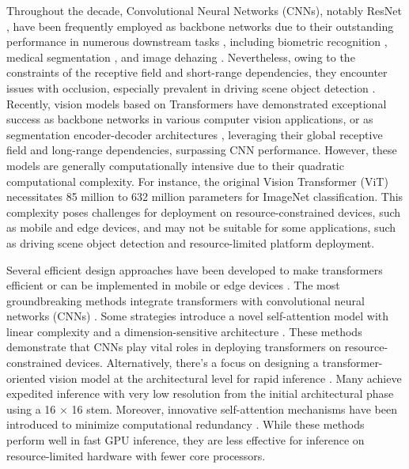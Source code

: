 Throughout the decade, Convolutional Neural Networks (CNNs), notably ResNet \cite{he2016deep}, have been frequently employed as backbone networks due to their outstanding performance in numerous downstream tasks \cite{Djenouri9757754}, including biometric recognition \cite{hsu2024inpainting, li2021identity}, medical segmentation \cite{tan2023multi}, and image dehazing \cite{li2024ma}. Nevertheless, owing to the constraints of the receptive field and short-range dependencies, they encounter issues with occlusion, especially prevalent in driving scene object detection \cite{wang2023centernet}. Recently, vision models based on Transformers have demonstrated exceptional success as backbone networks \cite{liu2021swin} in various computer vision applications, or as segmentation encoder-decoder architectures \cite{chen2023transattunet}, leveraging their global receptive field and long-range dependencies, surpassing CNN performance. However, these models are generally computationally intensive due to their quadratic computational complexity. For instance, the original Vision Transformer (ViT) \cite{dosovitskiy2020image} necessitates 85 million to 632 million parameters for ImageNet classification. This complexity poses challenges for deployment on resource-constrained devices, such as mobile and edge devices, and may not be suitable for some applications, such as driving scene object detection \cite{wang2023centernet} and resource-limited platform deployment. 

Several efficient design approaches have been developed to make transformers efficient or can be implemented in mobile or edge devices \cite{maaz2022edgenext, li2022efficientformer, mehta2022mobilevit, mehta2023separable, li2023rethinking}. The most groundbreaking methods integrate transformers with convolutional neural networks (CNNs) \cite{maaz2022edgenext, mehta2022mobilevit}. Some strategies introduce a novel self-attention model with linear complexity \cite{mehta2023separable} and a dimension-sensitive architecture \cite{li2022efficientformer, li2023rethinking}. These methods demonstrate that CNNs play vital roles in deploying transformers on resource-constrained devices. Alternatively, there's a focus on designing a transformer-oriented vision model at the architectural level for rapid inference \cite{graham2021levit, liu2023efficientvit, yun2024shvit}. Many achieve expedited inference with very low resolution from the initial architectural phase using a 16 $\times$ 16 stem. Moreover, innovative self-attention mechanisms have been introduced to minimize computational redundancy \cite{liu2023efficientvit, yun2024shvit}. While these methods perform well in fast GPU inference, they are less effective for inference on resource-limited hardware with fewer core processors. 

